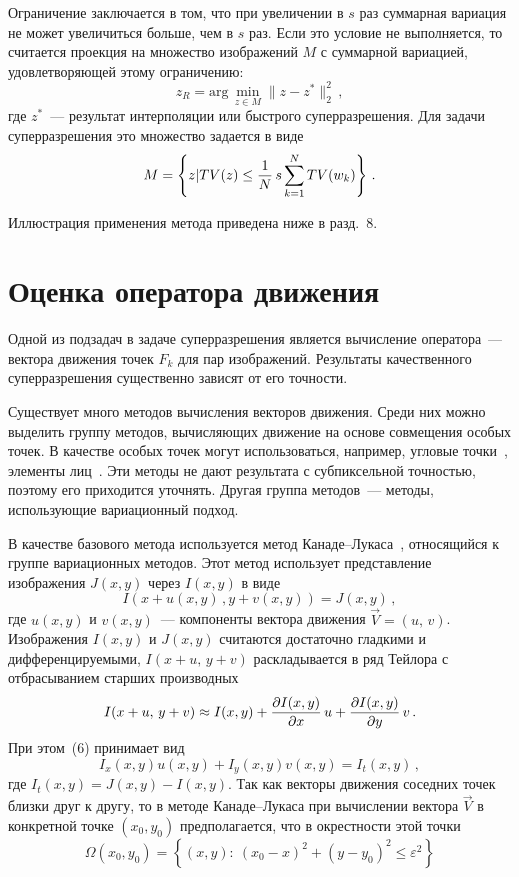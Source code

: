 \begin{multicols}{2}
     Ограничение заключается в том, что при увеличении в $s$ раз суммарная
вариация не может увеличиться больше, чем в $s$ раз. Если это условие не
выполняется, то считается проекция на множество изображений $M$ с суммарной
вариацией, удовлетворяющей этому ограничению:
     $$
z_R =\mathrm{arg}\,\underset{z\in M}{\min}\parallel z-z^*\parallel_2^2\,,
     $$
где $z^*$~--- результат интерполяции или быстрого суперразрешения. Для задачи
суперразрешения это множество задается в виде
$$
M = \left \{ z\vert TV(z)\leq \displaystyle\frac{\displaystyle 1\mathstrut}{\displaystyle N\mathstrut}\, s\sum\limits_{k=1}^N TV(w_k)\right \}\,.
$$

     Иллюстрация применения метода приведена ниже в разд.~8.

     \section{Оценка оператора движения}

     Одной из подзадач в задаче суперразрешения является вычисление оператора~---
вектора движения точек $F_k$ для пар изображений. Результаты качественного
суперразрешения существенно зависят от его точности.

     Существует много методов вычисления векторов движения. Среди них
можно выделить группу методов, вычисляющих движение на основе совмещения
особых точек. В качестве особых точек могут использоваться, например, угловые
точки~\cite{20nas}, элементы лиц~\cite{21nas}. Эти методы не дают результата с
субпиксельной точностью, поэтому его приходится уточнять. Другая группа
     методов~--- методы, использующие вариационный подход.

     В качестве базового метода используется метод Канаде--Лукаса~\cite{22nas},
относящийся к группе вариационных методов. Этот метод использует пред\-став\-ле\-ние
изображения $J(x,y)$ через $I(x,y)$ в виде
     \begin{equation}
     I(x+u(x,y)\,,y+v(x,y)) = J(x,y)\,,
     \label{e6nas}
     \end{equation}
где $u(x,y)$ и $v(x,y)$~--- компоненты вектора движения $\vec{V} =(u,\,v)$.
Изображения $I(x,y)$ и $J(x,y)$ считаются достаточно гладкими и
диф\-фе\-рен\-ци\-ру\-емы\-ми, $I(x+u,\,y+v)$ раскладывается в ряд Тейлора с отбрасыванием
старших производных
$$
I(x+u,\,y+v)\approx I(x,y)+\displaystyle\frac{\displaystyle \partial I(x,y)\mathstrut}{\displaystyle \partial x\mathstrut}\,u+\displaystyle\frac{\displaystyle \partial I(x,y)\mathstrut}{\displaystyle \partial
y\mathstrut}\,v\,.
$$
При этом~(6) принимает вид
\begin{equation*}
I_x (x,y)u(x,y)+I_y(x,y)v(x,y)=I_t(x,y)\,,
\end{equation*}
где $I_t(x,y) =J(x,y)-I(x,y)$. Так как векторы движения соседних точек близки друг к
другу, то в методе Канаде--Лукаса при вычислении вектора $\vec{V}$ в конкретной
точке $(x_0,y_0)$ предполагается, что в окрестности этой точки
$$
\Omega (x_0,y_0) =
\left \{(x,y):\ (x_0-x)^2+(y-y_0)^2\leq \varepsilon^2\right \}
$$

\end{multicols}

